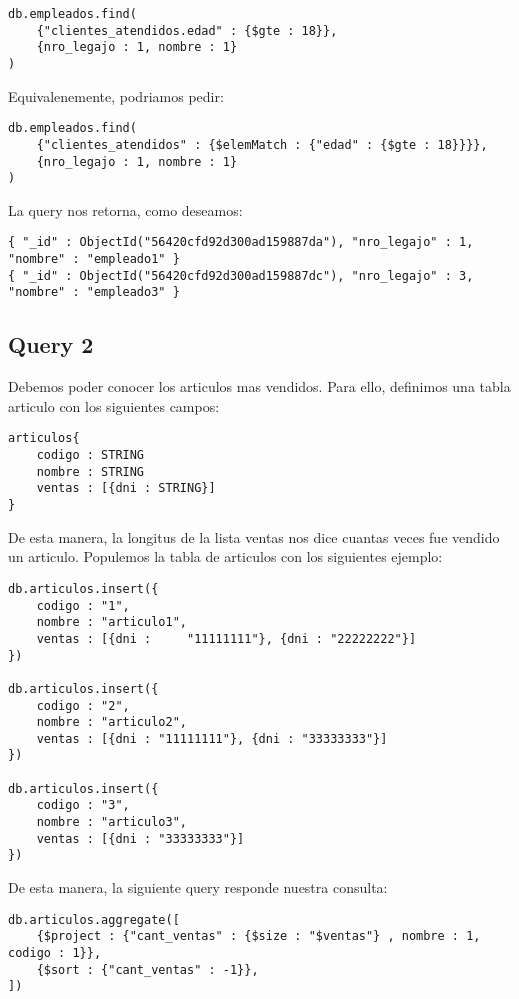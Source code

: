 \begin{verbatim}
db.empleados.find(
	{"clientes_atendidos.edad" : {$gte : 18}},
	{nro_legajo : 1, nombre : 1}
)
\end{verbatim}

Equivalenemente, podriamos pedir:

\begin{verbatim}
db.empleados.find(
	{"clientes_atendidos" : {$elemMatch : {"edad" : {$gte : 18}}}},
	{nro_legajo : 1, nombre : 1}
)
\end{verbatim}

La query nos retorna, como deseamos:

\begin{verbatim}
{ "_id" : ObjectId("56420cfd92d300ad159887da"), "nro_legajo" : 1, "nombre" : "empleado1" }
{ "_id" : ObjectId("56420cfd92d300ad159887dc"), "nro_legajo" : 3, "nombre" : "empleado3" }
\end{verbatim}

\subsection{Query 2}
Debemos poder conocer los articulos mas vendidos. Para ello, definimos una tabla articulo con los siguientes campos:

\begin{verbatim}
articulos{
	codigo : STRING
	nombre : STRING
	ventas : [{dni : STRING}]
}
\end{verbatim}

De esta manera, la longitus de la lista ventas nos dice cuantas veces fue vendido un articulo. Populemos la tabla de articulos con los siguientes ejemplo:

\begin{verbatim}
db.articulos.insert({
	codigo : "1",
	nombre : "articulo1",
	ventas : [{dni :	 "11111111"}, {dni : "22222222"}]
})

db.articulos.insert({
	codigo : "2",
	nombre : "articulo2",
	ventas : [{dni : "11111111"}, {dni : "33333333"}]
})

db.articulos.insert({
	codigo : "3",
	nombre : "articulo3",
	ventas : [{dni : "33333333"}]
})
\end{verbatim}

De esta manera, la siguiente query responde nuestra consulta:

\begin{verbatim}
db.articulos.aggregate([
	{$project : {"cant_ventas" : {$size : "$ventas"} , nombre : 1, codigo : 1}},
	{$sort : {"cant_ventas" : -1}},
])
\end{verbatim}

